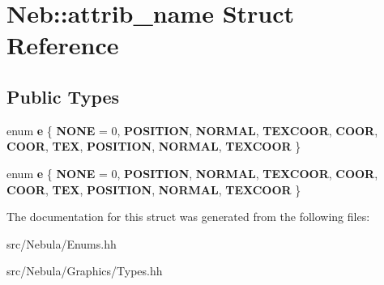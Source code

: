 \hypertarget{structNeb_1_1attrib__name}{\section{\-Neb\-:\-:attrib\-\_\-name \-Struct \-Reference}
\label{structNeb_1_1attrib__name}
}
\subsection*{\-Public \-Types}
\begin{DoxyCompactItemize}
\item 
enum {\bfseries e} \{ \*
{\bfseries \-N\-O\-N\-E} =  0, 
{\bfseries \-P\-O\-S\-I\-T\-I\-O\-N}, 
{\bfseries \-N\-O\-R\-M\-A\-L}, 
{\bfseries \-T\-E\-X\-C\-O\-O\-R}, 
\*
{\bfseries \-C\-O\-O\-R}, 
{\bfseries \-C\-O\-O\-R}, 
{\bfseries \-T\-E\-X}, 
{\bfseries \-P\-O\-S\-I\-T\-I\-O\-N}, 
\*
{\bfseries \-N\-O\-R\-M\-A\-L}, 
{\bfseries \-T\-E\-X\-C\-O\-O\-R}
 \}
\item 
enum {\bfseries e} \{ \*
{\bfseries \-N\-O\-N\-E} =  0, 
{\bfseries \-P\-O\-S\-I\-T\-I\-O\-N}, 
{\bfseries \-N\-O\-R\-M\-A\-L}, 
{\bfseries \-T\-E\-X\-C\-O\-O\-R}, 
\*
{\bfseries \-C\-O\-O\-R}, 
{\bfseries \-C\-O\-O\-R}, 
{\bfseries \-T\-E\-X}, 
{\bfseries \-P\-O\-S\-I\-T\-I\-O\-N}, 
\*
{\bfseries \-N\-O\-R\-M\-A\-L}, 
{\bfseries \-T\-E\-X\-C\-O\-O\-R}
 \}
\end{DoxyCompactItemize}


\-The documentation for this struct was generated from the following files\-:\begin{DoxyCompactItemize}
\item 
src/\-Nebula/\-Enums.\-hh\item 
src/\-Nebula/\-Graphics/\-Types.\-hh\end{DoxyCompactItemize}
